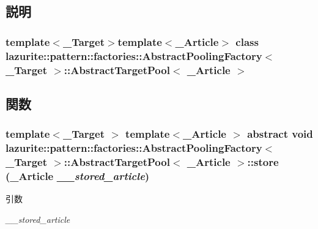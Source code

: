 \subsection{説明}
\subsubsection*{template$<$\_\-Target$>$template$<$\_\-Article$>$ class lazurite::pattern::factories::AbstractPoolingFactory$<$ \_\-Target $>$::AbstractTargetPool$<$ \_\-Article $>$}



\subsection{関数}
\hypertarget{classlazurite_1_1pattern_1_1factories_1_1_abstract_pooling_factory_3_01___target_01_4_1_1_abstra513b29652c04fa77de240c337e958a8d_a2d11e4ff0f0cdb377a20750454d562b7}{
\subsubsection[{store}]{\setlength{\rightskip}{0pt plus 5cm}template$<$\_\-Target $>$ template$<$\_\-Article $>$ abstract void lazurite::pattern::factories::AbstractPoolingFactory$<$ \_\-Target $>$::AbstractTargetPool$<$ \_\-Article $>$::store (\_\-Article {\em \_\-\_\-stored\_\-article})}}
\label{classlazurite_1_1pattern_1_1factories_1_1_abstract_pooling_factory_3_01___target_01_4_1_1_abstra513b29652c04fa77de240c337e958a8d_a2d11e4ff0f0cdb377a20750454d562b7}

\begin{DoxyParams}{引数}
\item[{\em \_\-\_\-stored\_\-article}]\end{DoxyParams}


